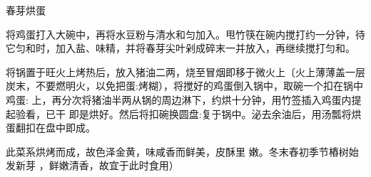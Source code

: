 \begin{recipe}{春芽烘蛋}

\ingredients


\cooking

\step 将鸡蛋打入大碗中，再将水豆粉与清水和匀加入。甩竹筷在碗内搅打约一分钟，待
它匀和时，加入盐、味精，并将春芽尖叶剁成碎末一并放入，再继续搅打匀和。

\step 将锅置于旺火上烤热后，放入猪油二两，烧至冒烟即移于微火上〔火上薄薄盖一层
炭末，不要燃明火，以免把蛋:烤糊），将搅好的鸡蛋倒入锅中，取碗一个扣在锅中鸡蛋:
上，再分次将猪油半两从锅的周边淋下，约烘十分钟，用竹签插入鸡蛋内提起验看，已干
即是烘好。然后将扣碗换圆盘:复于锅中。泌去余油后，用汤瓢将烘蛋翻扣在盘中即成。

\features

此菜系烘烤而成，故色泽金黄，味咸香而鲜美，皮酥里 嫩。冬末舂初季节樁树始发新芽
，鲜嫩清香，故宜于此时食用）

\end{recipe}

